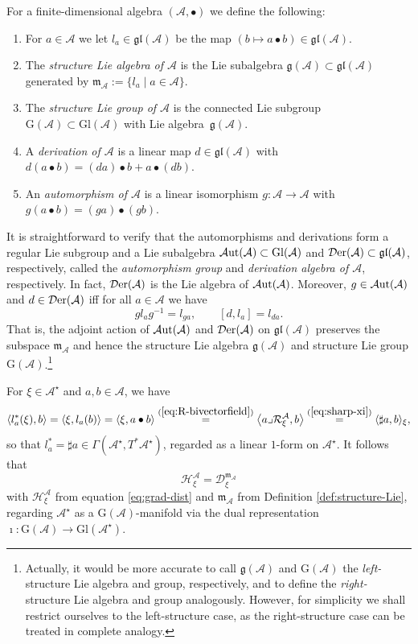 \documentclass[10pt,a4paper]{amsart}
\numberwithin{equation}{section}
\newcommand{\be}{\begin{equation}}
\newcommand{\ee}{\end{equation}}
\newcommand{\hh}{\mathcal{H}}
\newcommand{\Aut}{\mathcal{A}{\rm ut}}
\newcommand{\Der}{\mathcal{D}{\rm er}}
\newcommand{\dcal}{\mathcal{D}}
\newcommand{\m}{\mathfrak{m}}
\newcommand{\G}{\mathrm{G}}
\newcommand{\Gl}{{\mathrm{Gl}}}
\newcommand{\g}{{\mathfrak{g}}}
\renewcommand{\m}{{\mathfrak m}}
\newcommand{\gl}{{\mathfrak{gl}}}
\newcommand{\cR}{\mathcal{R}}
\newcommand{\cA}{\mathcal{A}}
\begin{document}
\begin{Definition} \label{def:structure-Lie} For a finite-dimensional algebra $(\cA, \bullet)$ we define the following:
\begin{enumerate}\itemsep=0pt
\item[(1)]
For $a \in \cA$ we let $l_a \in \gl(\cA)$ be the map $(b \mapsto a \bullet b) \in \gl(\cA)$.
\item[(2)]
The {\em structure Lie algebra of $\cA$ }is the Lie subalgebra $\g(\cA) \subset \gl(\cA)$ generated by $\m_\cA := \{l_a \mid a \in \cA\}$.
\item[(3)]
The {\em structure Lie group of $\cA$ }is the connected Lie subgroup $\G(\cA) \subset \Gl(\cA)$ with Lie algebra~$\g(\cA)$.
\item[(4)]
A {\em derivation of $\cA$ }is a linear map $d \in \gl(\cA)$ with $d(a \bullet b) = (da) \bullet b + a \bullet (db)$.
\item[(5)]
An {\em automorphism of $\cA$ }is a linear isomorphism $g\colon \cA \to \cA$ with $g(a \bullet b) = (ga) \bullet (gb)$.
\end{enumerate}
\end{Definition}

It is straightforward to verify that the automorphisms and derivations form a regular Lie subgroup and a Lie subalgebra $\Aut(\cA) \subset \Gl(\cA)$ and $\Der(\cA) \subset \gl(\cA)$, respectively, called the {\em automorphism group }and {\em derivation algebra of $\cA$}, respectively. In fact, $\Der(\cA)$ is the Lie algebra of $\Aut(\cA)$. Moreover, $g \in \Aut(\cA)$ and $d \in \Der(\cA)$ iff for all $a \in \cA$ we have
\be \label{eq:der-leftaction}
g l_a g^{-1} = l_{ga}, \qquad [d, l_a] = l_{da}.
\ee
That is, the adjoint action of $\Aut(\cA)$ and $\Der(\cA)$ on $\gl(\cA)$ preserves the subspace $\m_\cA$ and hence the structure Lie algebra $\g(\cA)$ and structure Lie group $\G(\cA)$.\footnote{Actually, it would be more accurate to call $\g(\cA)$ and $\G(\cA)$ the {\em left-}structure Lie algebra and group, respectively, and to define the {\em right-}structure Lie algebra and group analogously. However, for simplicity we shall restrict ourselves to the left-structure case, as the right-structure case can be treated in complete analogy.}

For $\xi \in \cA^\star$ and $a,b \in \cA$, we have
\[
\langle l_a^\ast(\xi), b \rangle = \langle \xi, l_a(b)\rangle = \langle \xi, a \bullet b\rangle \stackrel{(\ref{eq:R-bivectorfield})}= \big\langle a \lrcorner \cR^\cA_\xi, b\big\rangle \stackrel{(\ref{eq:sharp-xi})}= \langle \sharp a, b
\rangle_\xi,
\]
so that $l_a^\ast = \sharp a \in \Gamma(\cA^\star, T^\ast \cA^\star)$, regarded as a linear $1$-form on $\cA^\star$. It follows that
\be \label{eq:grad=dist}
\hh^\cA_\xi = \dcal^{\m_\cA}_\xi
\ee
with $\hh^\cA_\xi$ from equation \eqref{eq:grad-dist} and $\m_\cA$ from Definition \ref{def:structure-Lie}, regarding $\cA^\star$ as a $\G(\cA)$-manifold via the dual representation $\imath\colon \G(\cA) \to \Gl(\cA^\star)$.
\end{document}
